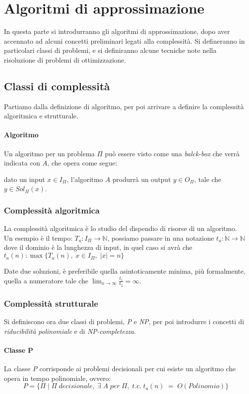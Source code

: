 \section{Algoritmi di approssimazione}
In questa parte si introdurranno gli algoritmi di approssimazione, 
dopo aver accennato ad alcuni concetti preliminari legati alla complessità.
Si defineranno in particolari classi di problemi, e si definiranno alcune 
tecniche note nella risoluzione di problemi di ottimizzazione.

\subsection{Classi di complessità}
Partiamo dalla definizione di algoritmo, per poi arrivare a definire la 
complessità algoritmica e strutturale.
\paragraph{Algoritmo}
Un algoritmo per un problema $\Pi$ può essere visto come una \emph{balck-box}
che verrà indicata con $A$, che opera come segue:

dato un input $x \in I_{\Pi}$, l'algoritmo $A$ produrrà un output 
$y \in O_{\Pi}$, tale che $y \in Sol_{\Pi}(x)$.

\subsubsection{Complessità algoritmica}
La complessità algoritmica è lo studio del dispendio di risorse di 
un algoritmo.\\
Un esempio è il tempo: $T_a : I_\Pi \rightarrow \mathbb{N}$, possiamo passare
in una notazione $t_a : \mathbb{N} \rightarrow \mathbb{N}$ dove il dominio è 
la lunghezza di input, in quel caso si avrà che $t_a(n) : \max\{ T_a(n),\; x \in I_{\Pi},\; |x| = n\}$

Date due soluzioni, è preferibile quella asintoticamente minima, 
più formalmente, quella a numeratore tale che $\lim_{x \to \infty} \frac{t_1}{t_2} = \infty $.

\subsubsection{Complessità strutturale}
Si definiscono ora due classi di problemi, \emph{P} e \emph{NP}, per 
poi introdurre i concetti di \emph{riducibilità polinomiale} e di \emph{NP-completezza}.

\paragraph{Classe P}
La classe \emph{P} corrisponde ai problemi decisionali 
per cui esiste un algoritmo che opera
in tempo polinomiale, ovvero: 
$$P = \{\Pi\;|\;\Pi\;decisionale, \; \exists\;A\;per\;\Pi,\;t.c.\;t_a(n)\;=\;O(Polinomio)\}$$

